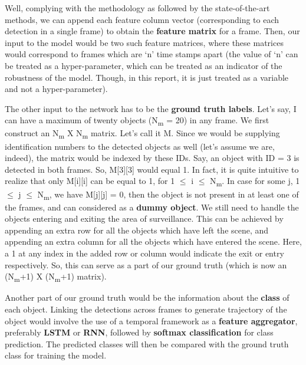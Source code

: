 \documentclass[a4paper]{article}
\begin{document}
    Well, complying with the methodology as followed by the state-of-the-art methods, we can append each feature column vector (corresponding to each detection in a single frame) to obtain the \textbf{feature matrix} for a frame. Then, our input to the model would be two such feature matrices, where these matrices would correspond to frames which are ‘n’ time stamps apart (the value of ‘n’ can be treated as a hyper-parameter, which can be treated as an indicator of the robustness of the model. Though, in this report, it is just treated as a variable and not a hyper-parameter).


    The other input to the network has to be the \textbf{ground truth labels}. Let’s say, I can have a maximum of twenty objects (N\textsubscript{m}  = 20) in any frame. We first construct an N\textsubscript{m} X N\textsubscript{m} matrix. Let’s call it M. Since we would be supplying identification numbers to the detected objects as well (let’s assume we are, indeed), the matrix would be indexed by these IDs. Say, an object with ID = 3 is detected in both frames. So, M[3][3] would equal 1. In fact, it is quite intuitive to realize that only M[i][i] can be equal to 1, for 1 $\leq$ i $\leq$ N\textsubscript{m}. In case for some j, 1 $\leq$ j $\leq$ N\textsubscript{m}, we have M[j][j] = 0, then the object is not present in at least one of the frames, and can considered as a \textbf{dummy object}. We still need to handle the objects entering and exiting the area of surveillance. This can be achieved by appending an extra row for all the objects which have left the scene, and appending an extra column for all the objects which have entered the scene. Here, a 1 at any index in the added row or column would indicate the exit or entry respectively. So, this can serve as a part of our ground truth (which is now an (N\textsubscript{m}+1) X (N\textsubscript{m}+1) matrix).

    Another part of our ground truth would be the information about the \textbf{class} of each object. Linking the detections across frames to generate trajectory of the object would involve the use of a temporal framework as a \textbf{feature aggregator}, preferably \textbf{LSTM} or \textbf{RNN}, followed by \textbf{softmax classification} for class prediction. The predicted classes will then be compared with the ground truth class for training the model.
\end{document}

